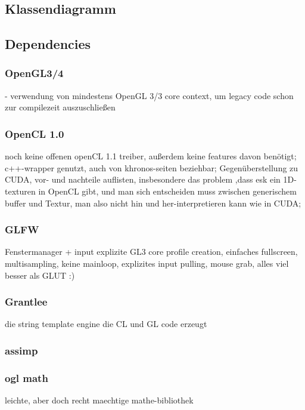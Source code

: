 
\label{sec:systemArchitecture}

	
 

\subsection{Klassendiagramm}



\subsection{Dependencies}
	\label{sec:dependencies}

		
	\subsubsection{OpenGL3/4}
	
	- verwendung von mindestens OpenGL 3/3 core context, um legacy code schon zur compilezeit auszuschließen
	
	
    \subsubsection{OpenCL 1.0}
    	noch keine offenen openCL 1.1 treiber, außerdem keine features davon benötigt;
    	c++-wrapper genutzt, auch von khronos-seiten beziehbar;
    	Gegenüberstellung zu CUDA, vor- und nachteile auflisten, insbesondere das problem ,dass esk ein 1D-texturen in OpenCL gibt, und man sich entscheiden muss zwischen generischem buffer und Textur, man also nicht hin und her-interpretieren kann wie in CUDA;
    
    
    \subsubsection{GLFW}
    	Fenstermanager + input
    	explizite GL3 core profile creation, einfaches fullscreen, multisampling, keine mainloop, explizites input pulling, 
    	mouse grab, alles viel besser als GLUT :)
    \subsubsection{Grantlee}
       die string template engine die CL und GL code erzeugt
    \subsubsection{assimp}
    \subsubsection{ogl math}
    	leichte, aber doch recht maechtige mathe-bibliothek

